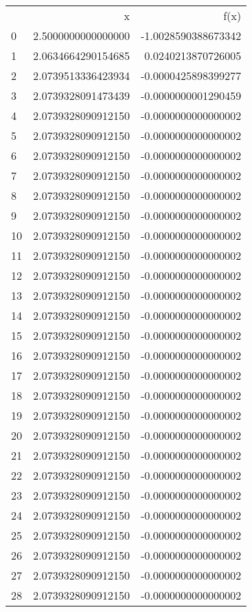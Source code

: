 \begin{tabular}{lrr}
 & x & f(x) \\
0 & 2.5000000000000000 & -1.0028590388673342 \\
1 & 2.0634664290154685 & 0.0240213870726005 \\
2 & 2.0739513336423934 & -0.0000425898399277 \\
3 & 2.0739328091473439 & -0.0000000001290459 \\
4 & 2.0739328090912150 & -0.0000000000000002 \\
5 & 2.0739328090912150 & -0.0000000000000002 \\
6 & 2.0739328090912150 & -0.0000000000000002 \\
7 & 2.0739328090912150 & -0.0000000000000002 \\
8 & 2.0739328090912150 & -0.0000000000000002 \\
9 & 2.0739328090912150 & -0.0000000000000002 \\
10 & 2.0739328090912150 & -0.0000000000000002 \\
11 & 2.0739328090912150 & -0.0000000000000002 \\
12 & 2.0739328090912150 & -0.0000000000000002 \\
13 & 2.0739328090912150 & -0.0000000000000002 \\
14 & 2.0739328090912150 & -0.0000000000000002 \\
15 & 2.0739328090912150 & -0.0000000000000002 \\
16 & 2.0739328090912150 & -0.0000000000000002 \\
17 & 2.0739328090912150 & -0.0000000000000002 \\
18 & 2.0739328090912150 & -0.0000000000000002 \\
19 & 2.0739328090912150 & -0.0000000000000002 \\
20 & 2.0739328090912150 & -0.0000000000000002 \\
21 & 2.0739328090912150 & -0.0000000000000002 \\
22 & 2.0739328090912150 & -0.0000000000000002 \\
23 & 2.0739328090912150 & -0.0000000000000002 \\
24 & 2.0739328090912150 & -0.0000000000000002 \\
25 & 2.0739328090912150 & -0.0000000000000002 \\
26 & 2.0739328090912150 & -0.0000000000000002 \\
27 & 2.0739328090912150 & -0.0000000000000002 \\
28 & 2.0739328090912150 & -0.0000000000000002 \\

\end{tabular}
